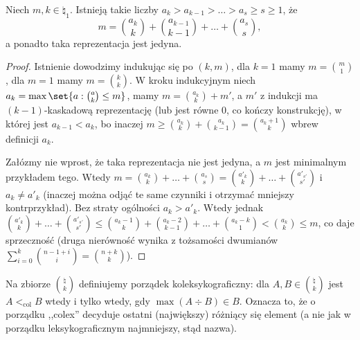 \begin{theorem}
	Niech $m,k\in\natural_1$. Istnieją takie liczby $a_k > a_{k-1} > \ldots > a_s \ge s
		\ge 1$, że
	$$m = \binom{a_k}{k} + \binom{a_{k-1}}{k-1} + \ldots + \binom{a_s}{s},$$
	a ponadto taka reprezentacja jest jedyna.
\end{theorem}
\begin{proof}
	Istnienie dowodzimy indukując się po $(k,m)$, dla $k=1$ mamy $m =
		\binom{m}{1}$, dla $m=1$ mamy $m = \binom{k}{k}$. W kroku indukcyjnym niech
	$a_k = \max\set{a : \binom{a}{k}\le m}$, mamy $m = \binom{a_k}{k} + m'$, a
	$m'$ z indukcji ma $(k-1)$-kaskadową reprezentację (lub jest równe $0$, co
	kończy konstrukcję), w której jest $a_{k-1} < a_k$, bo inaczej $m \ge
		\binom{a_k}{k} + \binom{a_k}{k-1} = \binom{a_k+1}{k}$ wbrew definicji $a_k$.

	Załózmy nie wprost, że taka reprezentacja nie jest jedyna, a $m$ jest
	minimalnym przykładem tego. Wtedy $m = \binom{a_k}{k} + \ldots +
		\binom{a_s}{s} = \binom{a'_k}{k} + \ldots + \binom{a'_{s'}}{s'}$ i $a_k\ne
		a'_k$ (inaczej można odjąć te same czynniki i otrzymać mniejszy
	kontrprzykład). Bez straty ogólności $a_k > a'_k$. Wtedy jednak
	$\binom{a'_k}{k} + \ldots + \binom{a'_{s'}}{s'} \le \binom{a_k-1}{k} +
		\binom{a_k-2}{k-1} + \ldots + \binom{a_k-k}{1} < \binom{a_k}{k} \le m$, co
	daje sprzeczność (druga nierówność wynika z tożsamości dwumianów
	$\sum_{i=0}^{k}\binom{n-1+i}{i} = \binom{n+k}{k}$).
\end{proof}

\begin{definition}
	Na zbiorze $\binom{\natural}{k}$ definiujemy porządek koleksykograficzny: dla
	$A,B \in \binom{\natural}{k}$ jest $A <_{\text{col}} B$ wtedy i tylko wtedy, gdy
	$\max(A\div B)\in B$. Oznacza to, że o porządku ,,colex'' decyduje ostatni (największy)
	różniący się element (a nie jak w porządku leksykograficznym najmniejszy, stąd nazwa).
\end{definition}


